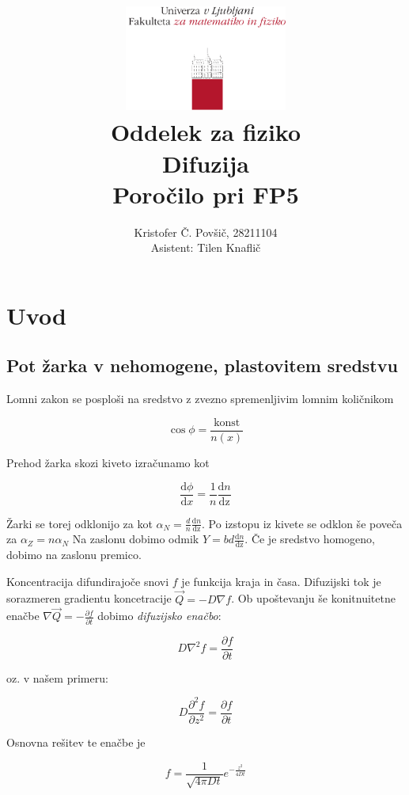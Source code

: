 \documentclass[11pt]{article}
\title{
  \includegraphics[width=0.4\textwidth]{fmf_logo}\\
  {\small Oddelek za fiziko} \\
  {Difuzija}\\
  {\small Poročilo pri FP5}\\

}
\date{}
\author{ Kristofer Č. Povšič, 28211104 \\[5 cm]
 \small  Asistent: Tilen Knaflič \\
}
\begin{document}
\maketitle
\newpage
\tableofcontents

\section{Uvod}\label{sec:org7496756}
\subsection{Pot žarka v nehomogene, plastovitem sredstvu}\label{sec:org81f2c64}
Lomni zakon se posploši na sredstvo z zvezno spremenljivim lomnim količnikom

\[ \cos \phi = \frac{\text{konst}}{n(x)}
\]

Prehod žarka skozi kiveto izračunamo kot

\begin{equation}
\label{eq:1}
\frac{\mathrm{d} \phi}{\mathrm{d} x} = \frac{1}{n} \frac{\mathrm{d} n}{\mathrm{dz} }
\end{equation}

Žarki se torej odklonijo za kot \(\alpha_N = \frac{d}{n} \frac{\mathrm{d} n}{\mathrm{dz}}\). Po izstopu iz kivete se odklon še poveča za \(\alpha_Z = n \alpha_N\) Na zaslonu dobimo odmik \(Y = bd \frac{\mathrm{d} n}{\mathrm{dz}}\). Če je sredstvo homogeno, dobimo na zaslonu premico.

Koncentracija difundirajoče snovi \(f\) je funkcija kraja in časa. Difuzijski tok je sorazmeren gradientu koncetracije \(\vec{Q} = - D \nabla f\). Ob upoštevanju še konitnuitetne enačbe \(\nabla \vec{Q} = -\frac{\partial f}{\partial t}\) dobimo \emph{difuzijsko enačbo}:

\begin{equation}
\label{eq:2}
D \nabla ^2 f = \frac{\partial f}{\partial t}
\end{equation}

oz. v našem primeru:

\begin{equation}
\label{eq:3}
D \frac{\partial ^2 f}{\partial z ^2} = \frac{\partial f}{\partial t}
\end{equation}

Osnovna rešitev te enačbe je

\begin{equation}
\label{eq:4}
f = \frac{1}{\sqrt{4 \pi Dt}} e^{- \frac{z ^2}{4Dt}}
\end{equation}
\end{document}
